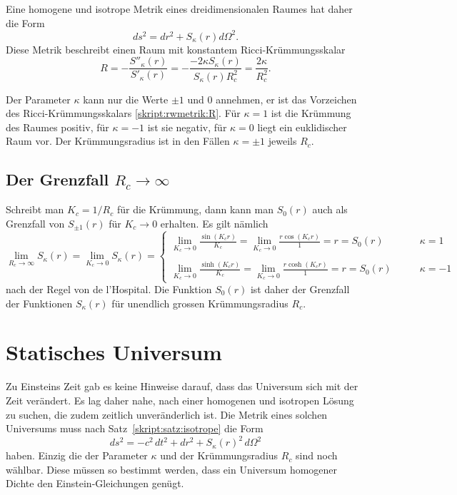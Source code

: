 \begin{satz}
Eine homogene und isotrope Metrik eines dreidimensionalen Raumes
hat daher die Form
\begin{equation}
ds^2=dr^2 + S_{\kappa}(r)d\Omega^2.
\label{skript:rwmetrik:metrikS}
\end{equation}
Diese Metrik beschreibt einen Raum mit konstantem
Ricci-Krümmungs\-skalar 
\begin{equation}
R
=
-\frac{S''_\kappa(r)}{S'_\kappa(r)}
=
-\frac{-2\kappa S_\kappa(r)}{S_\kappa(r)R_c^2}
=
\frac{2\kappa}{R_c^2}.
\label{skript:rwmetrik:R}
\end{equation}
\end{satz}
Der Parameter $\kappa$ kann nur die Werte $\pm 1$ und $0$ annehmen, er ist
das Vorzeichen des Ricci-Krümmungs\-skalars \eqref{skript:rwmetrik:R}.
Für $\kappa=1$ ist die Krümmung des Raumes positiv, für $\kappa=-1$ ist
sie negativ, für $\kappa=0$ liegt ein euklidischer Raum vor.
Der Krümmungsradius ist in den Fällen $\kappa=\pm1$ jeweils $R_c$.

\subsection{Der Grenzfall $R_c\to\infty$}
Schreibt man $K_c = 1/R_c$ für die Krümmung, dann kann man $S_0(r)$
auch als Grenzfall von $S_{\pm 1}(r)$ für $K_c\to 0$ erhalten.
Es gilt  nämlich
\begin{equation}
\lim_{R_c\to\infty} S_\kappa(r)
=
\lim_{K_c\to 0} S_\kappa(r)
=\begin{cases}
\displaystyle
\lim_{K_c\to 0}\frac{\displaystyle \sin(K_cr)}{\displaystyle K_c}
=
\lim_{K_c\to 0}\frac{\displaystyle r\cos(K_cr)}{\displaystyle 1} = r = S_0(r)
&\qquad\kappa=1
\\
\\
\displaystyle
\lim_{K_c\to 0}\frac{\displaystyle \sinh(K_cr)}{\displaystyle K_c}
=
\lim_{K_c\to 0}\frac{\displaystyle r\cosh(K_cr)}{\displaystyle 1} = r = S_0(r)
&\qquad\kappa=-1
\end{cases}
\end{equation}
nach der Regel von de l'Hospital.
Die Funktion $S_0(r)$ ist daher der Grenzfall der Funktionen
$S_\kappa(r)$ für unendlich grossen Krümmungsradius $R_c$.

\section{Statisches Universum}
%
Zu Einsteins Zeit gab es keine Hinweise darauf, dass das Universum
sich mit der Zeit verändert.
Es lag daher nahe, nach einer homogenen und isotropen Lösung zu suchen,
die zudem zeitlich unveränderlich ist.
Die Metrik eines solchen Universums muss nach
Satz~\ref{skript:satz:isotrope}
die Form
\[
ds^2
=
-c^2\,dt^2 + dr^2 + S_\kappa(r)^2\,d\Omega^2
\]
haben.
Einzig die der Parameter $\kappa$ und der Krümmungsradius $R_c$ sind
noch wählbar. 
Diese müssen so bestimmt werden, dass ein Universum homogener Dichte
den Einstein-Gleichungen genügt.

